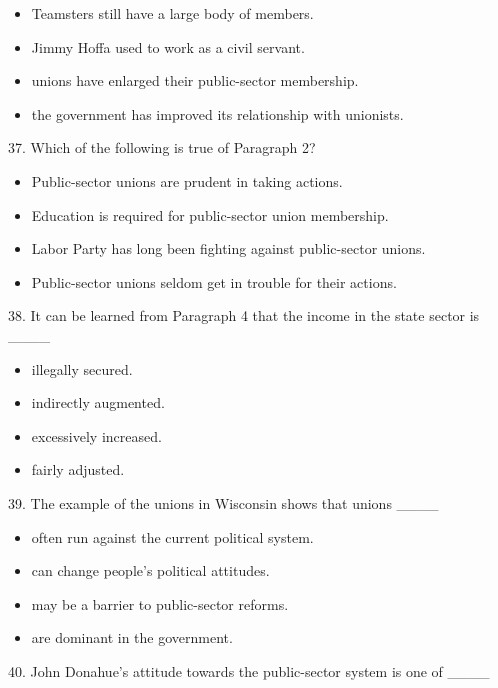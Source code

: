 \documentclass[UTF8,11pt]{ctexart}
\begin{document}
\begin{itemize}[leftmargin=2em,itemsep=.2em,topsep=.4em]\item[A.] Teamsters still have a large body of members.
\item[B.] Jimmy Hoffa used to work as a civil servant.
\item[C.] unions have enlarged their public-sector membership.
\item[D.] the government has improved its relationship with unionists.
\end{itemize}

37. Which of the following is true of Paragraph 2?


\begin{itemize}[leftmargin=2em,itemsep=.2em,topsep=.4em]\item[A.] Public-sector unions are prudent in taking actions.
\item[B.] Education is required for public-sector union membership.
\item[C.] Labor Party has long been fighting against public-sector unions.
\item[D.] Public-sector unions seldom get in trouble for their actions.
\end{itemize}

38. It can be learned from Paragraph 4 that the income in the state sector is \_\_\_\_


\begin{itemize}[leftmargin=2em,itemsep=.2em,topsep=.4em]\item[A.] illegally secured.
\item[B.] indirectly augmented.
\item[C.] excessively increased.
\item[D.] fairly adjusted.
\end{itemize}

39. The example of the unions in Wisconsin shows that unions \_\_\_\_


\begin{itemize}[leftmargin=2em,itemsep=.2em,topsep=.4em]\item[A.] often run against the current political system.
\item[B.] can change people’s political attitudes.
\item[C.] may be a barrier to public-sector reforms.
\item[D.] are dominant in the government.
\end{itemize}

40. John Donahue’s attitude towards the public-sector system is one of \_\_\_\_
\end{document}
